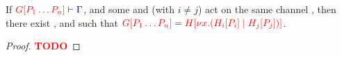 \begin{lemmaB}\label{thm:nc-progress-beta}
  If $\seq[{ \cpPlug{G}{P_1 \dots P_n} }]{ \Gamma }$, and some  and
   (with $i \neq j$) act on the same channel , then there exist ,
   and  such that 
  \(
  \tm{\cpPlug{G}{P_1 \dots P_n}} =
  \tm{\cpPlug{H}{\cpCut{x}{\cpPlug{H_i}{P_i}}{\cpPlug{H_j}{P_j}}}}
  \).
\end{lemmaB}
\begin{proof}
  \textcolor{red}{\bfseries TODO}
\end{proof}
